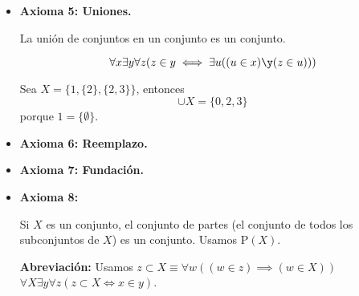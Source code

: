 	\begin{itemize}
		\item \textbf{Axioma 5: Uniones.}
		  
		 La unión de conjuntos en un conjunto es un conjunto.
		 
		 $$\forall x \exists y \forall z (z\in y\iff\exists u((u\in x)\y (z\in u)))$$
		 
		 \begin{example}
			Sea $X=\{1,\{2\},\{2,3\}\}$, entonces
			$$\cup X = \{0, 2, 3\}$$ porque $1=\{\emptyset\}$.
		 \end{example}
		 
		 \item \textbf{Axioma 6: Reemplazo.}
		 \item \textbf{Axioma 7: Fundación.}
		 \item \textbf{Axioma 8: }

		 Si $X$ es un conjunto, el conjunto de partes (el conjunto de todos los subconjuntos de $X$) es un conjunto. Usamos $\mathrm {P}(X)$.
		 
		 \textbf{Abreviación: } Usamos $z\subset X \equiv \forall w((w\in z)\implies (w\in X))$
		 $\forall X \exists y \forall z(z\subset X\iff x\in y)$.
	\end{itemize}

